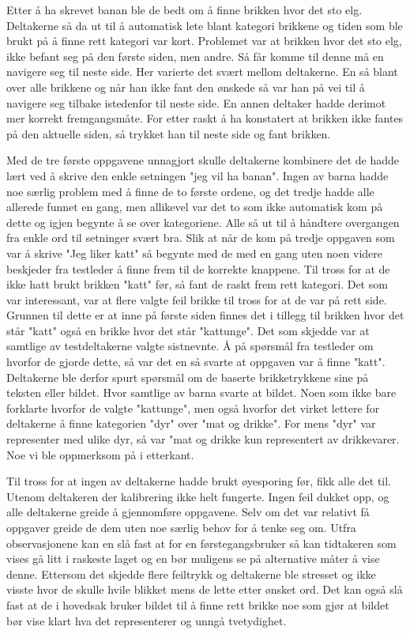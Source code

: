  
Etter å ha skrevet banan ble de bedt om å finne brikken hvor det sto elg. Deltakerne så da ut til å automatisk lete blant kategori brikkene og tiden som ble brukt på å finne rett kategori var kort. Problemet var at brikken hvor det sto elg, ikke befant seg på den første siden, men andre. Så får komme til denne må en navigere seg til neste side. Her varierte det svært mellom deltakerne. En så blant over alle brikkene og når han ikke fant den ønskede så var han på vei til å navigere seg tilbake istedenfor til neste side. En annen deltaker hadde derimot mer korrekt fremgangsmåte. For etter raskt å ha konstatert at brikken ikke fantes på den aktuelle siden, så trykket han til neste side og fant brikken.  
 
Med de tre første oppgavene unnagjort skulle deltakerne kombinere det de hadde lært ved å skrive den enkle setningen "jeg vil ha banan". Ingen av barna hadde noe særlig problem med å finne de to første ordene, og det tredje hadde alle allerede funnet en gang, men allikevel var det to som ikke automatisk kom på dette og igjen begynte å se over kategoriene. Alle så ut til å håndtere overgangen fra enkle ord til setninger svært bra. Slik at når de kom på tredje oppgaven som var å skrive "Jeg liker katt" så begynte med de med en gang uten noen videre beskjeder fra testleder å finne frem til de korrekte knappene. Til tross for at de ikke hatt brukt brikken "katt" før, så fant de raskt frem rett kategori. Det som var interessant, var at flere valgte feil brikke til tross for at de var på rett side. Grunnen til dette er at inne på første siden finnes det i tillegg til brikken hvor det står "katt" også en brikke hvor det står "kattunge". Det som skjedde var at samtlige av testdeltakerne valgte sistnevnte. Å på spørsmål fra testleder om hvorfor de gjorde dette, så var det en så svarte at oppgaven var å finne "katt". Deltakerne ble derfor spurt spørsmål om de baserte brikketrykkene sine på teksten eller bildet. Hvor samtlige av barna svarte at bildet. Noen som ikke bare forklarte hvorfor de valgte "kattunge", men også hvorfor det virket lettere for deltakerne å finne kategorien "dyr" over "mat og drikke". For mens "dyr" var representer med ulike dyr, så var "mat og drikke kun representert av drikkevarer. Noe vi ble oppmerksom på i etterkant. 
 
Til tross for at ingen av deltakerne hadde brukt øyesporing før, fikk alle det til. Utenom deltakeren der kalibrering ikke helt fungerte. Ingen feil dukket opp, og alle deltakerne greide å gjennomføre oppgavene. Selv om det var relativt få oppgaver greide de dem uten noe særlig behov for å tenke seg om. Utfra observasjonene kan en slå fast at for en førstegangsbruker så kan tidtakeren som vises gå litt i raskeste laget og en bør muligens se på alternative måter å vise denne. Ettersom det skjedde flere feiltrykk og deltakerne ble stresset og ikke visste hvor de skulle hvile blikket mens de lette etter ønsket ord. Det kan også slå fast at de i hovedsak bruker bildet til å finne rett brikke noe som gjør at bildet bør vise klart hva det representerer og unngå tvetydighet.  
 

